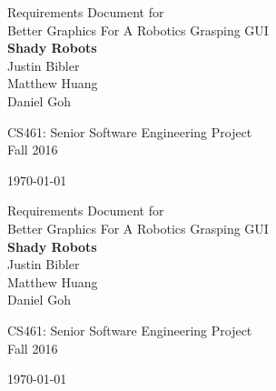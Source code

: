 \documentclass[10pt,journal,compsoc]{IEEEtran}
\begin{document}
\onecolumn

\begin{titlepage}
\null
\vspace{35mm}

\begin{flushleft}
\begin{bfseries}
	\vskip2mm
	\Huge{Requirements Document for\\ Better Graphics For A Robotics Grasping GUI}\\
	\vspace{30mm}
	\textbf{\huge Shady Robots} \\
	\vskip2mm
	\Large{Justin Bibler \\
	Matthew Huang \\
	Daniel Goh \\}
\end{bfseries}

\vspace{15mm}
\Large{CS461: Senior Software Engineering Project} \\
\Large{Fall 2016} \\

\vspace{10mm}

\today

\end{flushleft}

\newpage
\null
\vspace{35mm}

\begin{flushleft}
\begin{bfseries}
	\vskip2mm
	\Huge{Requirements Document for\\ Better Graphics For A Robotics Grasping GUI}\\
	\vspace{30mm}
	\textbf{\huge Shady Robots} \\
	\vskip2mm
	\Large{Justin Bibler \\
	Matthew Huang \\
	Daniel Goh \\}
\end{bfseries}

\vspace{15mm}
\Large{CS461: Senior Software Engineering Project} \\
\Large{Fall 2016} \\

\vspace{10mm}

\today


\end{flushleft}
\end{titlepage}
\end{document}
